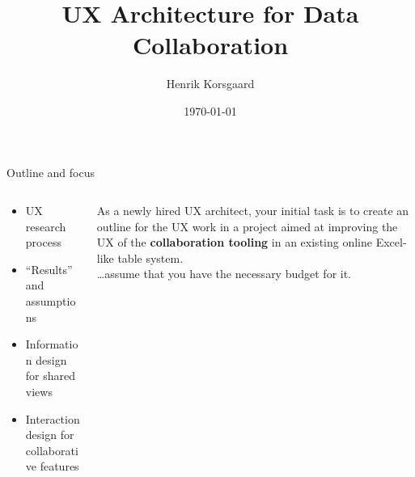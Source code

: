 \documentclass[aspectratio=169]{beamer}
\title[Stiby Systems Case Presentation]{UX Architecture for Data Collaboration}
\date[]{\today}
\author[]{Henrik Korsgaard}
\institute{DEPARTMENT OF COMPUTER SCIENCE} %
\begin{document}
\begin{frame}
\maketitle
\end{frame}

\begin{frame}{Outline and focus}
    \begin{columns}
        \begin{column}{0.5\textwidth}
            \begin{itemize}
                \item UX research process
                \item ``Results'' and assumptions
                \item Information design for shared views
                \item Interaction design for collaborative features
            \end{itemize}
        \end{column}
        \begin{column}{0.5\textwidth}
            As a newly hired UX architect, your initial task is to create an outline for the UX work in a project aimed at improving the UX of the \textbf{collaboration tooling} in an existing online Excel-like table system.\\
            \vspace{1em}
            {\color{HenrikFontLight}\dots assume that you have the necessary budget for it.}
        \end{column}
    \end{columns}
\end{frame}
\end{document}
